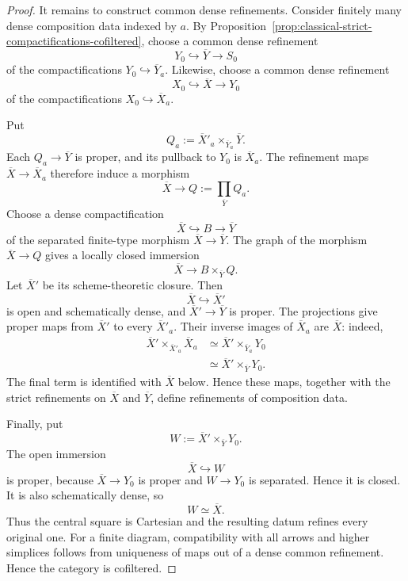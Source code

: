 \begin{proof}
It remains to construct common dense refinements.  Consider finitely many
dense composition data indexed by \(a\).  By
Proposition~\ref{prop:classical-strict-compactifications-cofiltered}, choose
a common dense refinement
\[
    Y_0\hookrightarrow\overline Y\longrightarrow S_0
\]
of the compactifications \(Y_0\hookrightarrow\overline Y_a\).  Likewise,
choose a common dense refinement
\[
    X_0\hookrightarrow\overline X\longrightarrow Y_0
\]
of the compactifications \(X_0\hookrightarrow\overline X_a\).

Put
\[
    Q_a
    :=
    \overline X'_a
    \times_{\overline Y_a}
    \overline Y.
\]
Each \(Q_a\to\overline Y\) is proper, and its pullback to \(Y_0\) is
\(\overline X_a\).  The refinement maps
\(\overline X\to\overline X_a\) therefore induce a morphism
\[
    \overline X
    \longrightarrow
    Q
    :=
    \prod_{\overline Y}Q_a.
\]
Choose a dense compactification
\[
    \overline X
    \hookrightarrow
    B
    \longrightarrow
    \overline Y
\]
of the separated finite-type morphism
\(\overline X\to\overline Y\).  The graph of the morphism
\(\overline X\to Q\) gives a locally closed immersion
\[
    \overline X
    \longrightarrow
    B\times_{\overline Y}Q.
\]
Let \(\overline X'\) be its scheme-theoretic closure.  Then
\[
    \overline X\hookrightarrow\overline X'
\]
is open and schematically dense, and
\(\overline X'\to\overline Y\) is proper.  The projections give proper maps
from \(\overline X'\) to every \(\overline X'_a\).  Their inverse images of
\(\overline X_a\) are \(\overline X\): indeed,
\[
\begin{aligned}
    \overline X'
    \times_{\overline X'_a}
    \overline X_a
    &\simeq
    \overline X'
    \times_{\overline Y_a}
    Y_0 \\
    &\simeq
    \overline X'
    \times_{\overline Y}
    Y_0.
\end{aligned}
\]
The final term is identified with \(\overline X\) below.  Hence these maps,
together with the strict refinements on \(\overline X\) and
\(\overline Y\), define refinements of composition data.

Finally, put
\[
    W
    :=
    \overline X'\times_{\overline Y}Y_0.
\]
The open immersion
\[
    \overline X\hookrightarrow W
\]
is proper, because \(\overline X\to Y_0\) is proper and \(W\to Y_0\) is
separated.  Hence it is closed.  It is also schematically dense, so
\[
    W\simeq\overline X.
\]
Thus the central square is Cartesian and the resulting datum refines every
original one.  For a finite diagram, compatibility with all arrows and
higher simplices follows from uniqueness of maps out of a dense common
refinement.  Hence the category is cofiltered.
\end{proof}

